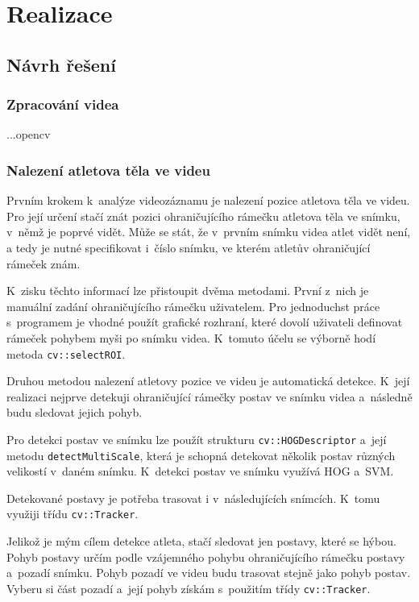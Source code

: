\chapter{Realizace}

\section{Návrh řešení}

\subsection{Zpracování videa}

...opencv

\subsection{Nalezení atletova těla ve videu}

Prvním krokem k~analýze videozáznamu je nalezení pozice atletova těla ve videu. Pro její určení stačí znát pozici ohraničujícího rámečku atletova těla ve snímku, v~němž je poprvé vidět. Může se stát, že v~prvním snímku videa atlet vidět není, a tedy je nutné specifikovat i~číslo snímku, ve kterém atletův ohraničující rámeček znám.

K~zisku těchto informací lze přistoupit dvěma metodami. První z~nich je manuální zadání ohraničujícího rámečku uživatelem. Pro jednoduchst práce s~programem je vhodné použít grafické rozhraní, které dovolí uživateli definovat rámeček pohybem myši po snímku videa. K~tomuto účelu se výborně hodí metoda \texttt{cv::selectROI}.

Druhou metodou nalezení atletovy pozice ve videu je automatická detekce. K~její realizaci nejprve detekuji ohraničující rámečky postav ve snímku videa a~následně budu sledovat jejich pohyb.

Pro detekci postav ve snímku lze použít strukturu \texttt{cv::HOGDescriptor} a~její metodu \texttt{detectMultiScale}, která je schopná detekovat několik postav různých velikostí v~daném snímku. K~detekci postav ve snímku využívá HOG a~SVM.

Detekované postavy je potřeba trasovat i v~následujících snímcích. K~tomu využiji třídu \texttt{cv::Tracker}.

Jelikož je mým cílem detekce atleta, stačí sledovat jen postavy, které se hýbou. Pohyb postavy určím podle vzájemného pohybu ohraničujícího rámečku postavy a~pozadí snímku. Pohyb pozadí ve videu budu trasovat stejně jako pohyb postav. Vyberu si část pozadí a~její pohyb získám s~použitím třídy \texttt{cv::Tracker}.


